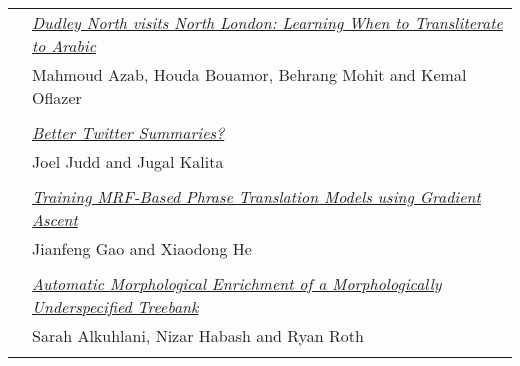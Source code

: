 \begin{tabular}{p{20mm}p{138mm}}
 & \hyperlink{page.439}{\em Dudley North visits North London: Learning When to Transliterate to Arabic}\\
         & Mahmoud Azab, Houda Bouamor, Behrang Mohit and Kemal Oflazer \\
\\

 & \hyperlink{page.445}{\em Better Twitter Summaries?}\\
         & Joel Judd and Jugal Kalita \\
\\

 & \hyperlink{page.450}{\em Training MRF-Based Phrase Translation Models using Gradient Ascent}\\
         & Jianfeng Gao and Xiaodong He \\
\\

 & \hyperlink{page.460}{\em Automatic Morphological Enrichment of a Morphologically Underspecified Treebank}\\
         & Sarah Alkuhlani, Nizar Habash and Ryan Roth \\
\\

\end{tabular}
\newpage

